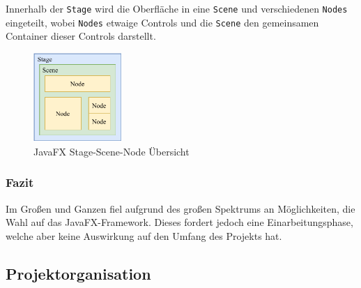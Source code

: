 Innerhalb der \lstinline[style=java]{Stage} wird die Oberfläche in eine \lstinline[style=java]{Scene} und verschiedenen \lstinline[style=java]{Nodes} eingeteilt, wobei \lstinline[style=java]{Nodes} etwaige Controls und die \lstinline[style=java]{Scene} den gemeinsamen Container dieser Controls darstellt.
\begin{figure}[H]
    \centering
    \includegraphics[width=0.3\textwidth]{fig/ainf/JavaFXStageSceneNode.pdf}
    \caption{JavaFX Stage-Scene-Node Übersicht}
    \label{fig:Stage-Scene-Node}
\end{figure}
\subsubsection{Fazit}
Im Großen und Ganzen fiel aufgrund des großen Spektrums an Möglichkeiten, die Wahl auf das JavaFX-Framework.
Dieses fordert jedoch eine Einarbeitungsphase, welche aber keine Auswirkung auf den Umfang des Projekts hat.
\subsection{Projektorganisation}\label{subsec:projektorganisation}
